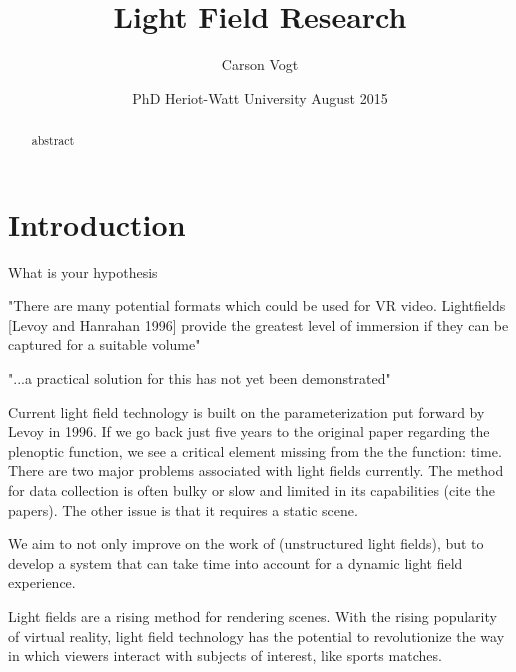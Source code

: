 \documentclass[12pt]{report}
\begin{document}
\title{Light Field Research \vspace{2.5cm}}	%
\author{
\Large Carson Vogt \vspace{1cm} \\ 
}

\date{
	\centering
	PhD \endgraf\medskip
	Heriot-Watt University \endgraf{} August 2015
}

\maketitle

\begin{abstract}
\begin{small}
abstract
\end{small}
\end{abstract}

\listoffigures

\tableofcontents

\chapter*{Introduction}
What is your hypothesis

"There are many potential formats which could be used for VR video.
Lightfields [Levoy and Hanrahan 1996] provide the greatest level of
immersion if they can be captured for a suitable volume"

"...a practical solution for this has not yet been demonstrated"

Current light field technology is built on the parameterization put forward by Levoy in 1996. If we go back just five years to the original paper regarding the plenoptic function, we see a critical element missing from the the function: time. There are two major problems associated with light fields currently. The method for data collection is often bulky or slow and limited in its capabilities (cite the papers). The other issue is that it requires a static scene. 

We aim to not only improve on the work of (unstructured light fields), but to develop a system that can take time into account for a dynamic light field experience. 

Light fields are a rising method for rendering scenes. With the rising popularity of virtual reality, light field technology has the potential to revolutionize the way in which viewers interact with subjects of interest, like sports matches.
\end{document}
